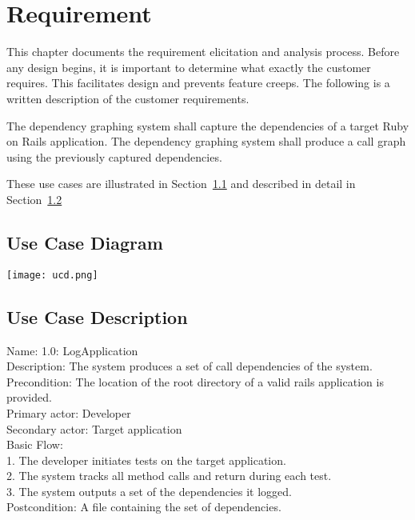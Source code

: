 \chapter{Requirement}
\label{chap:requirement}
This chapter documents the requirement elicitation and analysis process. Before any design begins, it is important to determine what exactly the customer requires. This facilitates design and prevents feature creeps. The following is a written description of the customer requirements.

The dependency graphing system shall capture the dependencies of a target Ruby on Rails application. The dependency graphing system shall produce a call graph using the previously captured dependencies.

These use cases are illustrated in Section~\ref{sec:ucd} and described in detail in Section~\ref{sec:descrip}

\section{Use Case Diagram}
\label{sec:ucd}
\begin{center}
    \texttt{[image: ucd.png]}
    \label{fig:ucd}
\end{center}


\section{Use Case Description}
\label{sec:descrip}
Name: 1.0: LogApplication \\
Description: The system produces a set of call dependencies of the system.\\
Precondition: The location of the root directory of a valid rails application is provided.\\
Primary actor: Developer\\
Secondary actor: Target application\\
Basic Flow:\\
1. The developer initiates tests on the target application.\\
2. The system tracks all method calls and return during each test.\\
3. The system outputs a set of the dependencies it logged.\\
Postcondition: A file containing the set of dependencies.\\

